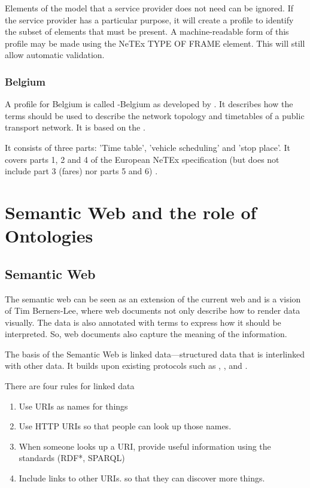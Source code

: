 Elements of the model that a service provider does not need can be ignored. If the service provider has a particular purpose, it will create a profile to identify the subset of elements that must be present. A machine-readable form of this profile may be made using the NeTEx TYPE OF FRAME element. This will still allow automatic validation.
\subsubsection{ Belgium}
A  profile for Belgium is called -Belgium \cite{noauthor_oslo_2023} as developed by . It describes how the terms should be used to describe the network topology and timetables of a public transport network. It is based on the .

It consists of three parts: 'Time table', 'vehicle scheduling' and 'stop place'. It covers parts 1, 2 and 4 of the European NeTEx specification (but does not include part 3 (fares) nor parts 5 and 6) \cite{noauthor_transportdatabe_nodate}.

\section{Semantic Web and the role of Ontologies}\label{section:ontologies_rel_work}
\subsection{Semantic Web}
The semantic web can be seen as an extension of the current web and is a vision of Tim Berners-Lee, where web documents not only describe how to render data visually. The data is also annotated with terms to express how it should be interpreted. So, web documents also capture the meaning of the information.

The basis of the Semantic Web is linked data—structured data that is interlinked with other data. It builds upon existing protocols such as , , and .

There are four rules for linked data
\begin{enumerate}
    \item Use URIs as names for things

    \item Use HTTP URIs so that people can look up those names.

    \item When someone looks up a URI, provide useful information using the standards (RDF*, SPARQL)

    \item Include links to other URIs. so that they can discover more things.

\end{enumerate}

